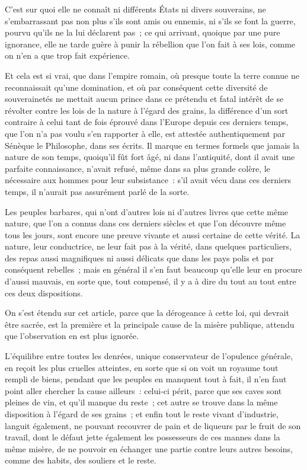 \documentclass[french,twoside]{book} %
\begin{document}
C’est sur quoi elle ne connaît ni différents États ni divers souverains, ne s’embarrassant pas non plus s’ils sont amis ou ennemis, ni s’ils se font la guerre, pourvu qu’ils ne la lui déclarent pas ; ce qui arrivant, quoique par une pure ignorance, elle ne tarde guère à punir la rébellion que l’on fait à ses lois, comme on n’en a que trop fait expérience.\par
Et cela est si vrai, que dans l’empire romain, où presque toute la terre connue ne reconnaissait qu’une domination, et où par conséquent cette diversité de souverainetés ne mettait aucun prince dans ce prétendu et fatal intérêt de se révolter contre les lois de la nature à l’égard des grains, la différence d’un sort contraire à celui tant de fois éprouvé dans l’Europe depuis ces derniers temps, que l’on n’a pas voulu s’en rapporter à elle, est attestée authentiquement par Sénèque le Philosophe, dans ses écrits. Il marque en termes formels que jamais la nature de son temps, quoiqu’il fût fort âgé, ni dans l’antiquité, dont il avait une parfaite connaissance, n’avait refusé, même dans sa plus grande colère, le nécessaire aux hommes pour leur subsistance : s’il avait vécu dans ces derniers temps, il n’aurait pas assurément parlé de la sorte.\par
Les peuples barbares, qui n’ont d’autres lois ni d’autres livres que cette même nature, que l’on a connus dans ces derniers siècles et que l’on découvre même tous les jours, sont encore une preuve vivante et aussi certaine de cette vérité. La nature, leur conductrice, ne leur fait pas à la vérité, dans quelques particuliers, des repas aussi magnifiques ni aussi délicats que dans les pays polis et par conséquent rebelles ; mais en général il s’en faut beaucoup qu’elle leur en procure d’aussi mauvais, en sorte que, tout compensé, il y a à dire du tout au tout entre ces deux dispositions.\par
On s’est étendu sur cet article, parce que la dérogeance à cette loi, qui devrait être sacrée, est la première et la principale cause de la misère publique, attendu que l’observation en est plus ignorée.\par
L’équilibre entre toutes les denrées, unique conservateur de l’opulence générale, en reçoit les plus cruelles atteintes, en sorte que si on voit un royaume tout rempli de biens, pendant que les peuples en manquent tout à fait, il n’en faut point aller chercher la cause ailleurs : celui-ci périt, parce que ses caves sont pleines de vin, et qu’il manque du reste ; cet autre se trouve dans la même disposition à l’égard de ses grains ; et enfin tout le reste vivant d’industrie, languit également, ne pouvant recouvrer de pain et de liqueurs par le fruit de son travail, dont le défaut jette également les possesseurs de ces mannes dans la même misère, de ne pouvoir en échanger une partie contre leurs autres besoins, comme des habits, des souliers et le reste.\par
\end{document}

